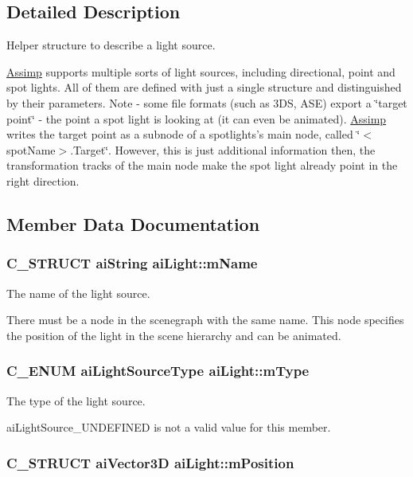 \subsection{Detailed Description}
Helper structure to describe a light source.

\hyperlink{namespace_assimp}{Assimp} supports multiple sorts of light sources, including directional, point and spot lights. All of them are defined with just a single structure and distinguished by their parameters. Note - some file formats (such as 3DS, ASE) export a \char`\"{}target point\char`\"{} - the point a spot light is looking at (it can even be animated). \hyperlink{namespace_assimp}{Assimp} writes the target point as a subnode of a spotlights's main node, called \char`\"{}$<$spotName$>$.Target\char`\"{}. However, this is just additional information then, the transformation tracks of the main node make the spot light already point in the right direction. 

\subsection{Member Data Documentation}
\hypertarget{structai_light_92806413f16230728b04e5f379fd00c0}{
\subsubsection[mName]{\setlength{\rightskip}{0pt plus 5cm}C\_\-STRUCT {\bf aiString} {\bf aiLight::mName}}}
\label{structai_light_92806413f16230728b04e5f379fd00c0}


The name of the light source.

There must be a node in the scenegraph with the same name. This node specifies the position of the light in the scene hierarchy and can be animated. \hypertarget{structai_light_4cba1741875dd92724ff55be91c60c2b}{
\subsubsection[mType]{\setlength{\rightskip}{0pt plus 5cm}C\_\-ENUM {\bf aiLightSourceType} {\bf aiLight::mType}}}
\label{structai_light_4cba1741875dd92724ff55be91c60c2b}


The type of the light source.

aiLightSource\_\-UNDEFINED is not a valid value for this member. \hypertarget{structai_light_5daf9c9ad2613603b847a527123611f0}{
\subsubsection[mPosition]{\setlength{\rightskip}{0pt plus 5cm}C\_\-STRUCT aiVector3D {\bf aiLight::mPosition}}}
\label{structai_light_5daf9c9ad2613603b847a527123611f0}


